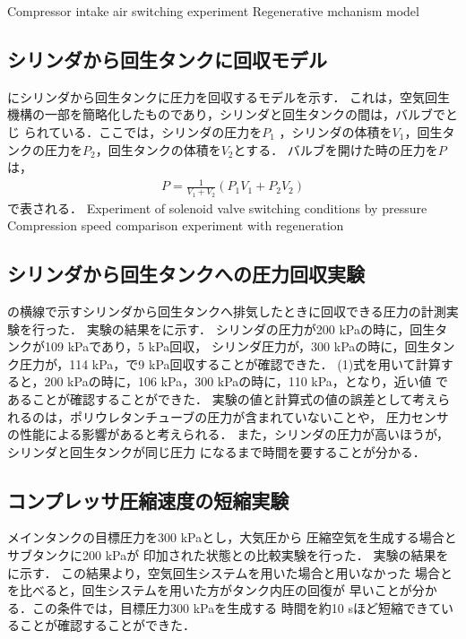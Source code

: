 {Compressor intake air switching experiment}
{Regenerative mchanism model}
\subsection{シリンダから回生タンクに回収モデル}
にシリンダから回生タンクに圧力を回収するモデルを示す．
これは，空気回生機構の一部を簡略化したものであり，シリンダと回生タンクの間は，バルブでとじ
られている．ここでは，シリンダの圧力を$P_1$
，シリンダの体積を$V_1$，回生タンクの圧力を$P_2$，回生タンクの体積を$V_2$とする．
バルブを開けた時の圧力を$P$は，
\begin{eqnarray}
    P = \frac{1}{V_{1} + V_{2}}(P_{1}V_{1} + P_{2}V_{2})
\end{eqnarray}
で表される．
{Experiment of solenoid valve switching conditions by pressure}
{Compression speed comparison experiment with regeneration}
\subsection{シリンダから回生タンクへの圧力回収実験}
の横線で示すシリンダから回生タンクへ排気したときに回収できる圧力の計測実験を行った．
実験の結果をに示す．
シリンダの圧力が200 kPaの時に，回生タンクが109 kPaであり，5 kPa回収，
シリンダ圧力が，300 kPaの時に，回生タンク圧力が，114 kPa，で9 kPa回収することが確認できた．
(1)式を用いて計算すると，200 kPaの時に，106 kPa，300 kPaの時に，110 kPa，となり，近い値
であることが確認することができた．
実験の値と計算式の値の誤差として考えられるのは，ポリウレタンチューブの圧力が含まれていないことや，
圧力センサの性能による影響があると考えられる．
また，シリンダの圧力が高いほうが，シリンダと回生タンクが同じ圧力
になるまで時間を要することが分かる．
\subsection{コンプレッサ圧縮速度の短縮実験}
メインタンクの目標圧力を300 kPaとし，大気圧から
圧縮空気を生成する場合とサブタンクに200 kPaが
印加された状態との比較実験を行った．
実験の結果をに示す．
この結果より，空気回生システムを用いた場合と用いなかった
場合とを比べると，回生システムを用いた方がタンク内圧の回復が
早いことが分かる．この条件では，目標圧力300 kPaを生成する
時間を約10 sほど短縮できていることが確認することができた．